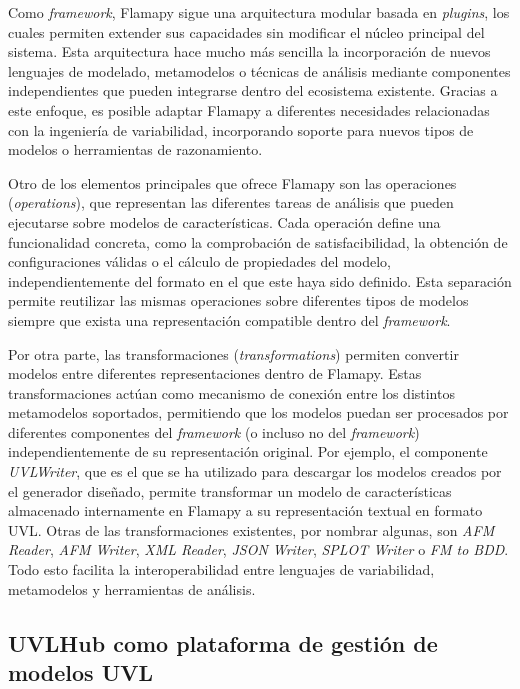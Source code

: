 Como \textit{framework}, Flamapy sigue una arquitectura modular basada en \textit{plugins}, los cuales permiten extender sus capacidades sin modificar el núcleo principal del sistema. Esta arquitectura hace mucho más sencilla la incorporación de nuevos lenguajes de modelado, metamodelos o técnicas de análisis mediante componentes independientes que pueden integrarse dentro del ecosistema existente. Gracias a este enfoque, es posible adaptar Flamapy a diferentes necesidades relacionadas con la ingeniería de variabilidad, incorporando soporte para nuevos tipos de modelos o herramientas de razonamiento.

Otro de los elementos principales que ofrece Flamapy son las operaciones (\textit{operations}), que representan las diferentes tareas de análisis que pueden ejecutarse sobre modelos de características. Cada operación define una funcionalidad concreta, como la comprobación de satisfacibilidad, la obtención de configuraciones válidas o el cálculo de propiedades del modelo, independientemente del formato en el que este haya sido definido. Esta separación permite reutilizar las mismas operaciones sobre diferentes tipos de modelos siempre que exista una representación compatible dentro del \textit{framework}.

Por otra parte, las transformaciones (\textit{transformations}) permiten convertir modelos entre diferentes representaciones dentro de Flamapy. Estas transformaciones actúan como mecanismo de conexión entre los distintos metamodelos soportados, permitiendo que los modelos puedan ser procesados por diferentes componentes del \textit{framework} (o incluso no del \textit{framework}) independientemente de su representación original. Por ejemplo, el componente \textit{UVLWriter}, que es el que se ha utilizado para descargar los modelos creados por el generador diseñado, permite transformar un modelo de características almacenado internamente en Flamapy a su representación textual en formato UVL. Otras de las transformaciones existentes, por nombrar algunas, son \textit{AFM Reader}, \textit{AFM Writer}, \textit{XML Reader}, \textit{JSON Writer}, \textit{SPLOT Writer} o \textit{FM to BDD}. Todo esto facilita la interoperabilidad entre lenguajes de variabilidad, metamodelos y herramientas de análisis.

\subsection{UVLHub como plataforma de gestión de modelos UVL}
\label{subsec:uvlhub_como_plataforma}

